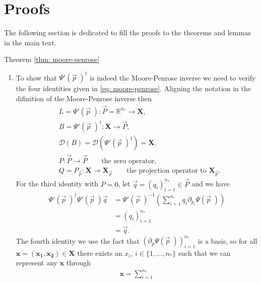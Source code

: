 \section{Proofs}
The following section is dedicated to fill the proofs to the theorems and
lemmas in the main text.
\begin{myproof}{Theorem \ref{thm: moore-penrose}}
    \label{proof: thm-moore-penrose}
    \begin{enumerate}
        \item To show that $\Psi'(\vec{p}\;)^{\dagger}$ is indeed the
            Moore-Penrose inverse we need to verify the four identities given
            in \ref{eq: moore-penrose}. Aligning the notation in the
            difinition of the Moore-Penrose inverse then
            \begin{align}
                &L = \Psi'(\vec{p}\;) : \vec{P}=\mathbb{R}^{n_*} \to
                \mathbf{X}, \\
                & B = \Psi'(\vec{p}\;)^{\dagger}: \mathbf{X} \to \vec{P}, \\
                &\mathcal{D}(B) = \mathcal{D}(\Psi'(\vec{p}\;)^{\dagger}) =
                \mathbf{X}, \\
                &P: \vec{P} \to \vec{P} \qquad \text{the zero operator},\\
                &Q = P_{\vec{p}}:\mathbf{X} \to \mathbf{X}_{\vec{p}}
                \qquad \text{the projection operator to }
                \mathbf{X}_{\vec{p}}.
            \end{align}
            For the third identity with $P = 0$, let $\vec{q} =
            (q_i)_{i=1}^{n_*} \in \vec{P}$ and we have
            \begin{align}
                \Psi'(\vec{p}\;)^{\dagger}\Psi'(\vec{p}\;)\vec{q} &=
                \Psi'(\vec{p}\;)^{-1}\left( \sum_{i=1}^{n_*} q_i
                \partial_{p_i} \Psi(\vec{p}\;) \right) \\
              &=\left(q_i  \right)_{i=1}^{n_*}  \\
              &= \vec{q}.
            \end{align}
            The fourth identity we use the fact that $(\partial_{p}
            \Psi(\vec{p}\;))_{i=1}^{n_*}$ is a basis, so for all $\mathbf{x}
            = (\mathbf{x_1}, \mathbf{x_2}) \in \mathbf{X}$ there exists an
            $x_i$, $i \in \{1,\ldots,n_*\}$ such that we can represent any
            $\mathbf{x}$ through
            \begin{align}
                \mathbf{x} = \sum_{i=1}^{n_*}

\end{align}
\end{enumerate}
\end{myproof}
